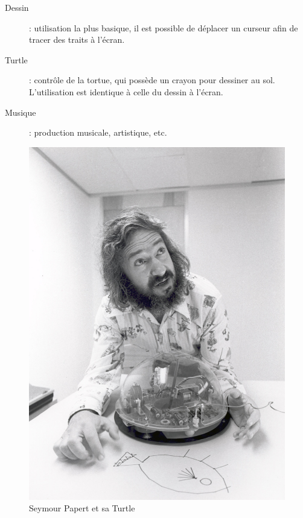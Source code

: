 \begin{minipage}[H]{0.5\linewidth}
  \begin{description}
    \item[Dessin] : utilisation la plus basique, il est possible de déplacer un curseur afin de tracer des traits à l'écran.
    \item[Turtle] : contrôle de la tortue, qui possède un crayon pour dessiner au sol. L'utilisation est identique à celle du dessin à l'écran.
    \item[Musique] : production musicale, artistique, etc.
  \end{description}
\end{minipage}
\begin{minipage}[H]{0.5\linewidth}
  \begin{figure}[H]
  \flushright
  \includegraphics[width=.9\textwidth]{../resources/illustrations/logo_turtle_1}
  \caption{Seymour Papert et sa Turtle}
  \end{figure}
\end{minipage}


